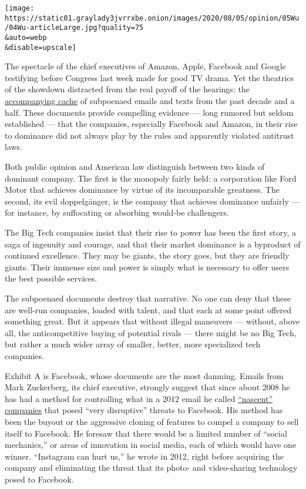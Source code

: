 \texttt{[image: https://static01.graylady3jvrrxbe.onion/images/2020/08/05/opinion/05Wu/04Wu-articleLarge.jpg?quality=75\\\&auto=webp\\\&disable=upscale]}

The spectacle of the chief executives of Amazon, Apple, Facebook and
Google testifying before Congress last week made for good TV drama. Yet
the theatrics of the showdown distracted from the real payoff of the
hearings: the
\href{https://judiciary.house.gov/online-platforms-and-market-power/}{accompanying
cache} of subpoenaed emails and texts from the past decade and a half.
These documents provide compelling evidence --- long rumored but seldom
established --- that the companies, especially Facebook and Amazon, in
their rise to dominance did not always play by the rules and apparently
violated antitrust laws.

Both public opinion and American law distinguish between two kinds of
dominant company. The first is the monopoly fairly held: a corporation
like Ford Motor that achieves dominance by virtue of its incomparable
greatness. The second, its evil doppelgänger, is the company that
achieves dominance unfairly --- for instance, by suffocating or
absorbing would-be challengers.

The Big Tech companies insist that their rise to power has been the
first story, a saga of ingenuity and courage, and that their market
dominance is a byproduct of continued excellence. They may be giants,
the story goes, but they are friendly giants. Their immense size and
power is simply what is necessary to offer users the best possible
services.

The subpoenaed documents destroy that narrative. No one can deny that
these are well-run companies, loaded with talent, and that each at some
point offered something great. But it appears that without illegal
maneuvers --- without, above all, the anticompetitive buying of
potential rivals --- there might be no Big Tech, but rather a much wider
array of smaller, better, more specialized tech companies.

Exhibit A is Facebook, whose documents are the most damning. Emails from
Mark Zuckerberg, its chief executive, strongly suggest that since about
2008 he has had a method for controlling what in a 2012 email he called
\href{https://papers.ssrn.com/sol3/papers.cfm?abstract_id=3624058}{``nascent''
companies} that posed ``very disruptive'' threats to Facebook. His
method has been the buyout or the aggressive cloning of features to
compel a company to sell itself to Facebook. He foresaw that there would
be a limited number of ``social mechanics,'' or areas of innovation in
social media, each of which would have one winner. ``Instagram can hurt
us,'' he wrote in 2012, right before acquiring the company and
eliminating the threat that its photo- and video-sharing technology
posed to Facebook.

